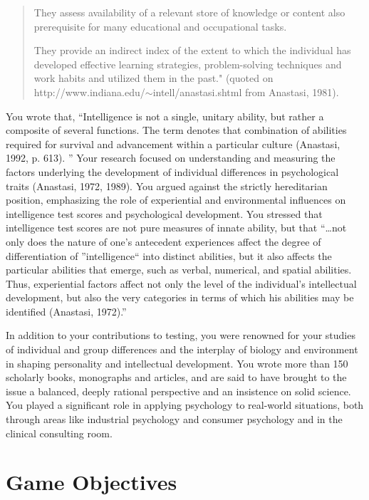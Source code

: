 \begin{refsection}
\begin{quote}
They assess availability of a relevant store of knowledge or content also prerequisite for many educational and occupational tasks.

They provide an indirect index of the extent to which the individual has developed effective learning strategies, problem-solving techniques and work habits and utilized them in the past." (quoted on http:\slash \slash www.indiana.edu\slash \ensuremath{\sim}intell\slash anastasi.shtml from Anastasi, 1981).
\end{quote}

You wrote that, ``Intelligence is not a single, unitary ability, but rather a composite of several functions. The term denotes that combination of abilities required for survival and advancement within a particular culture (Anastasi, 1992, p. 613). '' Your research focused on understanding and measuring the factors underlying the development of individual differences in psychological traits (Anastasi, 1972, 1989). You argued against the strictly hereditarian position, emphasizing the role of experiential and environmental influences on intelligence test scores and psychological development. You stressed that intelligence test scores are not pure measures of innate ability, but that ``{\ldots}not only does the nature of one's antecedent experiences affect the degree of differentiation of ''intelligence`` into distinct abilities, but it also affects the particular abilities that emerge, such as verbal, numerical, and spatial abilities. Thus, experiential factors affect not only the level of the individual's intellectual development, but also the very categories in terms of which his abilities may be identified (Anastasi, 1972).''

In addition to your contributions to testing, you were renowned for your studies of individual and group differences and the interplay of biology and environment in shaping personality and intellectual development. You wrote more than 150 scholarly books, monographs and articles, and are said to have brought to the issue a balanced, deeply rational perspective and an insistence on solid science. You played a significant role in applying psychology to real-world situations, both through areas like industrial psychology and consumer psychology and in the clinical consulting room.

\section{Game Objectives}
\label{gameobjectives}


\end{refsection}
